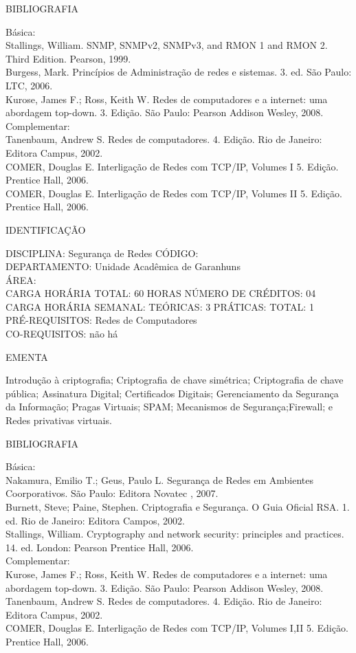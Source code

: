 \documentclass[
	12pt,				%
	openright,			%
  oneside,     %
	a4paper,			%
	chapter=TITLE,		%
	english,			%
	french,				%
	spanish,			%
	brazil				%
	]{abntex2}
\begin{document}
\begin{apendicesenv}
BIBLIOGRAFIA 

Básica:\\
Stallings, William. SNMP, SNMPv2, SNMPv3, and RMON 1 and RMON 2. Third
Edition. Pearson, 1999.\\
Burgess, Mark. Princípios de Administração de redes e sistemas. 3. ed.
São Paulo: LTC, 2006.\\
Kurose, James F.; Ross, Keith W. Redes de computadores e a internet: uma
abordagem top-down. 3. Edição. São Paulo: Pearson Addison Wesley,
2008.\\
Complementar:\\
Tanenbaum, Andrew S. Redes de computadores. 4. Edição. Rio de Janeiro:
Editora Campus, 2002. \\
COMER, Douglas E. Interligação de Redes com TCP/IP, Volumes I 5. Edição.
Prentice Hall, 2006.\\
COMER, Douglas E. Interligação de Redes com TCP/IP, Volumes II 5. Edição. Prentice Hall, 2006.

\newpage IDENTIFICAÇÃO

DISCIPLINA: Segurança de Redes CÓDIGO:\\ 
DEPARTAMENTO: Unidade Acadêmica de Garanhuns\\ 
ÁREA: \\
CARGA HORÁRIA TOTAL: 60 HORAS NÚMERO DE CRÉDITOS: 04\\
CARGA HORÁRIA SEMANAL: TEÓRICAS: 3 PRÁTICAS: TOTAL: 1 \\
PRÉ-REQUISITOS: Redes de Computadores\\
CO-REQUISITOS: não há

EMENTA 

Introdução à criptografia; Criptografia de chave simétrica; Criptografia
de chave pública; Assinatura Digital; Certificados Digitais;
Gerenciamento da Segurança da Informação; Pragas Virtuais; SPAM;
Mecanismos de Segurança;Firewall; e Redes privativas virtuais.

BIBLIOGRAFIA 

Básica:\\
Nakamura, Emilio T.; Geus, Paulo L. Segurança de Redes em Ambientes
Coorporativos. São Paulo: Editora Novatec , 2007. \\
Burnett, Steve; Paine, Stephen. Criptografia e Segurança. O Guia Oficial
RSA. 1. ed. Rio de Janeiro: Editora Campos, 2002.\\
Stallings, William. Cryptography and network security: principles and
practices. 14. ed. London: Pearson Prentice Hall, 2006.\\
Complementar:\\
Kurose, James F.; Ross, Keith W. Redes de computadores e a internet: uma
abordagem top-down. 3. Edição. São Paulo: Pearson Addison Wesley, 2008.\\
Tanenbaum, Andrew S. Redes de computadores. 4. Edição. Rio de Janeiro:
Editora Campus, 2002. \\
COMER, Douglas E. Interligação de Redes com TCP/IP, Volumes I,II 5.
Edição. Prentice Hall, 2006.


\end{apendicesenv}
\end{document}
